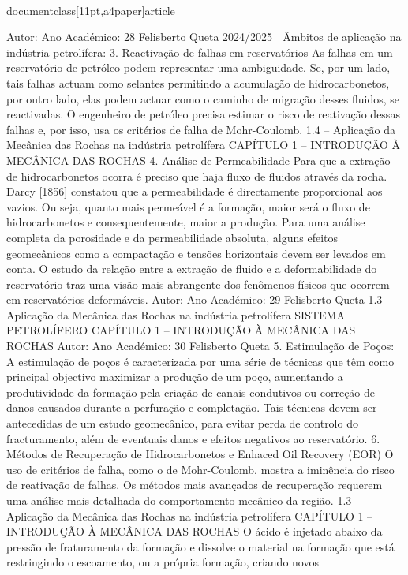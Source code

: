 \\documentclass[11pt,a4paper]{article}
\begin{document}
Autor:
Ano Académico:
28
Felisberto Queta
2024/2025

 Âmbitos de aplicação na indústria petrolífera:
3. Reactivação de falhas em reservatórios
As falhas em um reservatório de petróleo podem representar uma ambiguidade.
Se, por um lado, tais falhas actuam como selantes permitindo a acumulação de hidrocarbonetos, por outro lado, 
elas podem actuar como o caminho de migração desses fluidos, se reactivadas.
O engenheiro de petróleo precisa estimar o risco de reativação dessas falhas e, por isso, usa os critérios de falha 
de Mohr-Coulomb.
1.4 – Aplicação da Mecânica das Rochas na indústria petrolífera
CAPÍTULO 1 
–
 INTRODUÇÃO À MECÂNICA DAS ROCHAS
4. Análise de Permeabilidade
Para que a extração de hidrocarbonetos ocorra é preciso que haja fluxo de fluidos através da rocha. Darcy [1856]
constatou que a permeabilidade é directamente proporcional aos vazios. Ou seja, quanto mais permeável é a
formação, maior será o fluxo de hidrocarbonetos e consequentemente, maior a produção.
Para uma análise completa da porosidade e da permeabilidade absoluta, alguns efeitos geomecânicos como a
compactação e tensões horizontais devem ser levados em conta.
O estudo da relação entre a extração de fluido e a deformabilidade do reservatório traz uma visão mais
abrangente dos fenômenos físicos que ocorrem em reservatórios deformáveis.
Autor:
Ano Académico:
29
Felisberto Queta
1.3 – Aplicação da Mecânica das Rochas na indústria petrolífera
SISTEMA PETROLÍFERO
CAPÍTULO 1 
–
 INTRODUÇÃO À MECÂNICA DAS ROCHAS
Autor:
Ano Académico:
30
Felisberto Queta
5. Estimulação de Poços:
A estimulação de poços é caracterizada por uma série de técnicas que têm como principal objectivo maximizar a
produção de um poço, aumentando a produtividade da formação pela criação de canais condutivos ou correção
de danos causados durante a perfuração e completação.
Tais técnicas devem ser antecedidas de um estudo geomecânico, para evitar perda de controlo do fracturamento,
além de eventuais danos e efeitos negativos ao reservatório.
6. Métodos de Recuperação de Hidrocarbonetos e Enhaced Oil Recovery (EOR)
O uso de critérios de falha, como o de Mohr-Coulomb, mostra a iminência do risco de reativação de
falhas. Os métodos mais avançados de recuperação requerem uma análise mais detalhada do
comportamento mecânico da região.
1.3 – Aplicação da Mecânica das Rochas na indústria petrolífera
CAPÍTULO 1 
–
 INTRODUÇÃO À MECÂNICA DAS ROCHAS
O ácido é injetado 
abaixo da pressão de 
fraturamento da 
formação e dissolve o 
material na formação 
que está restringindo 
o escoamento, ou a 
própria formação, 
criando novos 
\end{document}
